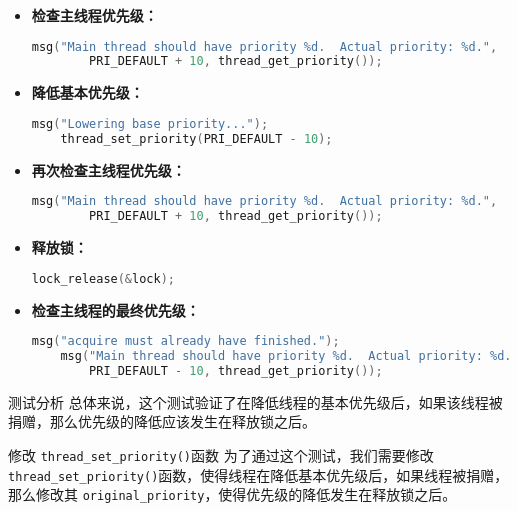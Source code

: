 \documentclass{beamer}
\begin{document}
\begin{frame}
\begin{itemize}
    \item \textbf{检查主线程优先级：}
          \begin{lstlisting}[language=C]
    msg("Main thread should have priority %d.  Actual priority: %d.",
        PRI_DEFAULT + 10, thread_get_priority());
\end{lstlisting}

    \item \textbf{降低基本优先级：}
          \begin{lstlisting}[language=C]
    msg("Lowering base priority...");
    thread_set_priority(PRI_DEFAULT - 10);
\end{lstlisting}

    \item \textbf{再次检查主线程优先级：}
          \begin{lstlisting}[language=C]
    msg("Main thread should have priority %d.  Actual priority: %d.",
        PRI_DEFAULT + 10, thread_get_priority());
\end{lstlisting}

    \item \textbf{释放锁：}
          \begin{lstlisting}[language=C]
    lock_release(&lock);
\end{lstlisting}

    \item \textbf{检查主线程的最终优先级：}
          \begin{lstlisting}[language=C]
    msg("acquire must already have finished.");
    msg("Main thread should have priority %d.  Actual priority: %d.",
        PRI_DEFAULT - 10, thread_get_priority());
\end{lstlisting}
  \end{itemize}

  \framebreak

  \begin{block}{测试分析}
    总体来说，这个测试验证了在降低线程的基本优先级后，如果该线程被捐赠，那么优先级的降低应该发生在释放锁之后。
  \end{block}

  \framebreak

  \begin{block}{修改 \texttt{thread\_set\_priority()}函数}
    为了通过这个测试，我们需要修改 \texttt{thread\_set\_priority()}函数，使得线程在降低基本优先级后，如果线程被捐赠，那么修改其 \texttt{original\_priority}，使得优先级的降低发生在释放锁之后。
  \end{block}


\end{frame}
\end{document}
